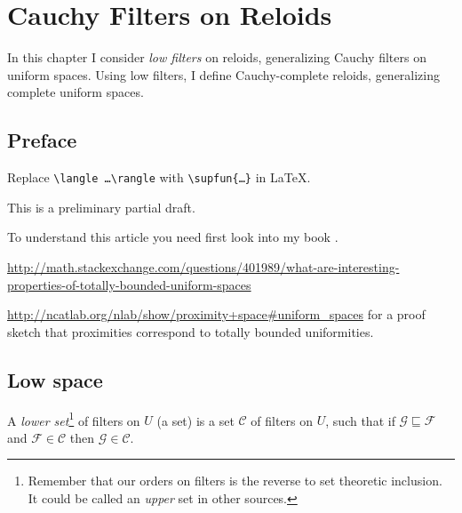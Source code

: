 \chapter{Cauchy Filters on Reloids}

In this chapter I consider \emph{low filters} on reloids, generalizing
Cauchy filters on uniform spaces. Using low filters, I define Cauchy-complete
reloids, generalizing complete uniform spaces.

\section{Preface}

Replace {\tt \textbackslash langle \dots \textbackslash rangle} with {\tt \textbackslash supfun\{\dots\}} in \LaTeX{}.

This is a preliminary partial draft.

To understand this article you need first look into my book \cite{volume-1}.

\url{http://math.stackexchange.com/questions/401989/what-are-interesting-properties-of-totally-bounded-uniform-spaces}

\url{http://ncatlab.org/nlab/show/proximity+space\#uniform\_spaces} for a proof
sketch that proximities correspond to totally bounded uniformities.

\section{Low space}


\begin{defn}
A \emph{lower set}\footnote{Remember that our orders on filters is the
reverse to set theoretic inclusion. It could be called an \emph{upper} set
in other sources.} of filters on $U$ (a set) is a set $\mathscr{C}$
of filters on $U$, such that if $\mathcal{G} \sqsubseteq
\mathcal{F}$ and $\mathcal{F} \in \mathscr{C}$ then $\mathcal{G} \in
\mathscr{C}$.
\end{defn}

